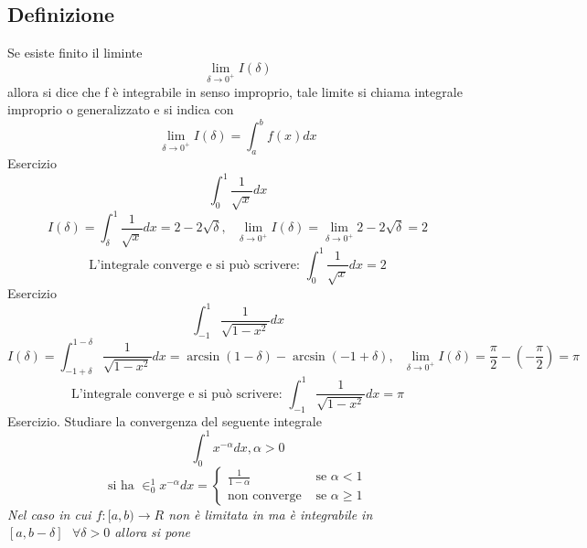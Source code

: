 \subsection{Definizione}
Se esiste finito il liminte
\begin{equation*}
	\lim_{\delta\to0^+}I(\delta)
\end{equation*}
allora si dice che f è integrabile in senso improprio, tale limite si chiama integrale improprio o generalizzato e si indica con
\begin{equation*}
	\lim_{\delta\to0^+}I(\delta)=\int^b_a f(x)dx
\end{equation*}
Esercizio
\begin{equation*}
	\int^1_0\frac{1}{\sqrt{x}}dx
\end{equation*}
\begin{equation*}
	I(\delta)=\int^1_\delta \frac{1}{\sqrt{x}}dx=2-2\sqrt{\delta},\text{ } \lim_{\delta \to 0^+} I(\delta)=\lim_{\delta\to0^+}2-2\sqrt{\delta}=2
\end{equation*}
\begin{equation}
	\text{L'integrale converge e si può scrivere: } \int^1_0\frac{1}{\sqrt{x}}dx=2
\end{equation}
Esercizio
\begin{equation*}
	\int^1_{-1}\frac{1}{\sqrt{1-x^2}}dx
\end{equation*}
\begin{equation*}
	I(\delta)=\int^{1-\delta}_{-1+\delta}\frac{1}{\sqrt{1-x^2}}dx=\arcsin(1-\delta)-\arcsin(-1+\delta), \text{ } \lim_{\delta\to0^+}I(\delta)=\frac{\pi}{2}-(-\frac{\pi}{2})=\pi
\end{equation*}
\begin{equation*}
	\text{L'integrale converge e si può scrivere: } \int^1_{-1}\frac{1}{\sqrt{1-x^2}}dx=\pi
\end{equation*}
Esercizio. Studiare la convergenza del seguente integrale
\begin{equation*}
	\int^1_0 x^{-\alpha}dx,\alpha>0
\end{equation*}
\begin{equation*}
	\text{si ha } \in^1_0x^{-\alpha} dx=\begin{cases}
		\frac{1}{1-\alpha} &\text{ se }\alpha<1\\
		\text{non converge} &\text{ se }\alpha\geq1
	\end{cases}
\end{equation*}
\textit{Nel caso in cui $f:[a,b)\to R$ non è limitata in ma è integrabile in $[a,b-\delta] \text{ } \forall \delta>0$ allora si pone}
